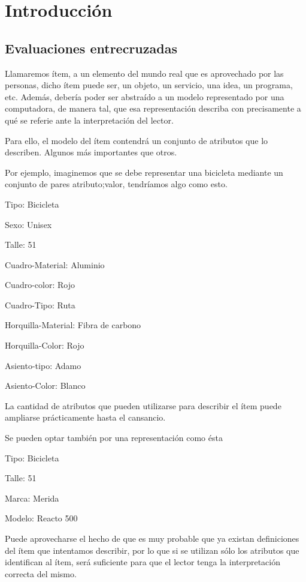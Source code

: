 \chapter{Introducción}
\label{chapter:introduccion}

\section{Evaluaciones entrecruzadas}
\label{section:evaluaciones-cruzadas}
Llamaremos ítem, a un elemento del mundo real que es aprovechado por las personas, dicho ítem puede ser, un objeto, un servicio, una idea, un programa, etc. Además, debería poder ser abstraído a un modelo representado por una computadora, de manera tal, que esa representación describa con precisamente a qué se referie ante la interpretación del lector. 

Para ello, el modelo del ítem contendrá un conjunto de atributos que lo describen. Algunos más importantes que otros.

Por ejemplo, imaginemos que se debe representar una bicicleta mediante un conjunto de pares atributo;valor, tendríamos algo como esto.

Tipo: Bicicleta

Sexo: Unisex

Talle: 51

Cuadro-Material: Aluminio

Cuadro-color: Rojo

Cuadro-Tipo: Ruta

Horquilla-Material: Fibra de carbono

Horquilla-Color: Rojo

Asiento-tipo: Adamo 

Asiento-Color: Blanco

La cantidad de atributos que pueden utilizarse para describir el ítem puede ampliarse prácticamente hasta el cansancio. 

Se pueden optar también por una representación como ésta

Tipo: Bicicleta

Talle: 51 

Marca: Merida

Modelo: Reacto 500

Puede aprovecharse el hecho de que es muy probable que ya existan definiciones del ítem que intentamos describir, por lo que si se utilizan sólo los atributos que identifican al ítem, será suficiente para que el lector tenga la interpretación correcta del mismo. 

